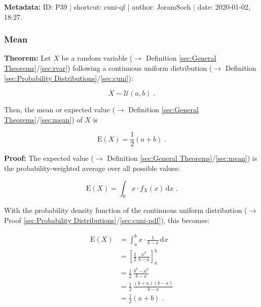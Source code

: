 \documentclass[a4paper,12pt,twoside]{book}
\begin{document}
\vspace{1em}
\textbf{Metadata:} ID: P39 | shortcut: cuni-qf | author: JoramSoch | date: 2020-01-02, 18:27.
\vspace{1em}



\subsubsection[\textbf{Mean}]{Mean} \label{sec:cuni-mean}
\setcounter{equation}{0}

\textbf{Theorem:} Let $X$ be a random variable ($\rightarrow$ Definition \ref{sec:General Theorems}/\ref{sec:rvar}) following a continuous uniform distribution ($\rightarrow$ Definition \ref{sec:Probability Distributions}/\ref{sec:cuni}):

\begin{equation} \label{eq:cuni-mean-cuni}
X \sim \mathcal{U}(a, b) \; .
\end{equation}

Then, the mean or expected value ($\rightarrow$ Definition \ref{sec:General Theorems}/\ref{sec:mean}) of $X$ is

\begin{equation} \label{eq:cuni-mean-cuni-mean}
\mathrm{E}(X) = \frac{1}{2} (a+b) \; .
\end{equation}


\vspace{1em}
\textbf{Proof:} The expected value ($\rightarrow$ Definition \ref{sec:General Theorems}/\ref{sec:mean}) is the probability-weighted average over all possible values:

\begin{equation} \label{eq:cuni-mean-mean}
\mathrm{E}(X) = \int_{\mathbb{R}} x \cdot f_X(x) \, \mathrm{d}x \; .
\end{equation}

With the probability density function of the continuous uniform distribution ($\rightarrow$ Proof \ref{sec:Probability Distributions}/\ref{sec:cuni-pdf}), this becomes:

\begin{equation} \label{eq:cuni-mean-cuni-mean-qed}
\begin{split}
\mathrm{E}(X) &= \int_a^b x \cdot \frac{1}{b-a} \, \mathrm{d}x \\
&= \left[ \frac{1}{2} \, \frac{x^2}{b-a} \right]_a^b \\
&= \frac{1}{2} \, \frac{b^2 - a^2}{b-a} \\
&= \frac{1}{2} \, \frac{(b+a)(b-a)}{b-a} \\
&= \frac{1}{2} (a+b) \; .
\end{split}
\end{equation}
\end{document}
